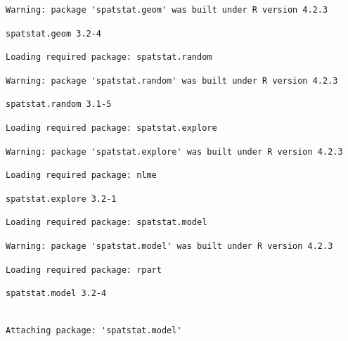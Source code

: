 \documentclass[
  letterpaper,
  DIV=11,
  numbers=noendperiod]{scrartcl}
\begin{document}
\begin{verbatim}
Warning: package 'spatstat.geom' was built under R version 4.2.3
\end{verbatim}

\begin{verbatim}
spatstat.geom 3.2-4
\end{verbatim}

\begin{verbatim}
Loading required package: spatstat.random
\end{verbatim}

\begin{verbatim}
Warning: package 'spatstat.random' was built under R version 4.2.3
\end{verbatim}

\begin{verbatim}
spatstat.random 3.1-5
\end{verbatim}

\begin{verbatim}
Loading required package: spatstat.explore
\end{verbatim}

\begin{verbatim}
Warning: package 'spatstat.explore' was built under R version 4.2.3
\end{verbatim}

\begin{verbatim}
Loading required package: nlme
\end{verbatim}

\begin{verbatim}
spatstat.explore 3.2-1
\end{verbatim}

\begin{verbatim}
Loading required package: spatstat.model
\end{verbatim}

\begin{verbatim}
Warning: package 'spatstat.model' was built under R version 4.2.3
\end{verbatim}

\begin{verbatim}
Loading required package: rpart
\end{verbatim}

\begin{verbatim}
spatstat.model 3.2-4
\end{verbatim}

\begin{verbatim}

Attaching package: 'spatstat.model'
\end{verbatim}
\end{document}
